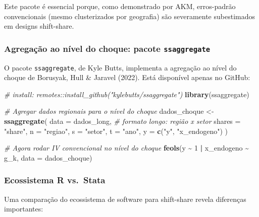 \documentclass[
]{article}
\newenvironment{Shaded}{\begin{snugshade}}{\end{snugshade}}
\newcommand{\AttributeTok}[1]{\textcolor[rgb]{0.13,0.29,0.53}{#1}}
\newcommand{\CommentTok}[1]{\textcolor[rgb]{0.56,0.35,0.01}{\textit{#1}}}
\newcommand{\DecValTok}[1]{\textcolor[rgb]{0.00,0.00,0.81}{#1}}
\newcommand{\FunctionTok}[1]{\textcolor[rgb]{0.13,0.29,0.53}{\textbf{#1}}}
\newcommand{\NormalTok}[1]{#1}
\newcommand{\OtherTok}[1]{\textcolor[rgb]{0.56,0.35,0.01}{#1}}
\newcommand{\SpecialCharTok}[1]{\textcolor[rgb]{0.81,0.36,0.00}{\textbf{#1}}}
\newcommand{\StringTok}[1]{\textcolor[rgb]{0.31,0.60,0.02}{#1}}
\begin{document}
Este pacote é essencial porque, como demonstrado por AKM, erros-padrão convencionais (mesmo clusterizados por geografia) são severamente subestimados em designs shift-share.

\subsubsection{\texorpdfstring{Agregação ao nível do choque: pacote \texttt{ssaggregate}}{Agregação ao nível do choque: pacote ssaggregate}}\label{agregauxe7uxe3o-ao-nuxedvel-do-choque-pacote-ssaggregate}

O pacote \texttt{ssaggregate}, de Kyle Butts, implementa a agregação ao nível do choque de Borusyak, Hull \& Jaravel (2022). Está disponível apenas no GitHub:

\begin{Shaded}
\begin{Highlighting}[]
\CommentTok{\# install: remotes::install\_github("kylebutts/ssaggregate")}
\FunctionTok{library}\NormalTok{(ssaggregate)}

\CommentTok{\# Agregar dados regionais para o nível do choque}
\NormalTok{dados\_choque }\OtherTok{\textless{}{-}} \FunctionTok{ssaggregate}\NormalTok{(}
  \AttributeTok{data =}\NormalTok{ dados\_long,     }\CommentTok{\# formato longo: região x setor}
  \AttributeTok{shares =} \StringTok{"share"}\NormalTok{,}
  \AttributeTok{n =} \StringTok{"regiao"}\NormalTok{,}
  \AttributeTok{s =} \StringTok{"setor"}\NormalTok{,}
  \AttributeTok{t =} \StringTok{"ano"}\NormalTok{,}
  \AttributeTok{y =} \FunctionTok{c}\NormalTok{(}\StringTok{"y"}\NormalTok{, }\StringTok{"x\_endogeno"}\NormalTok{)}
\NormalTok{)}

\CommentTok{\# Agora rodar IV convencional no nível do choque}
\FunctionTok{feols}\NormalTok{(y }\SpecialCharTok{\textasciitilde{}} \DecValTok{1} \SpecialCharTok{|}\NormalTok{ x\_endogeno }\SpecialCharTok{\textasciitilde{}}\NormalTok{ g\_k, }\AttributeTok{data =}\NormalTok{ dados\_choque)}
\end{Highlighting}
\end{Shaded}

\subsubsection{Ecossistema R vs.~Stata}\label{ecossistema-r-vs.-stata}

Uma comparação do ecossistema de software para shift-share revela diferenças importantes:
\end{document}

